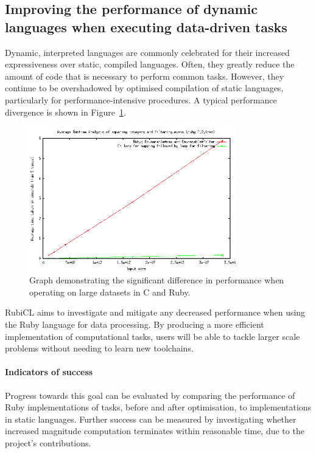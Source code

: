 \subsection{Improving the performance of dynamic languages when executing data-driven tasks}
Dynamic, interpreted languages are commonly celebrated for their increased expressiveness over static, compiled languages. Often, they greatly reduce the amount of code that is necessary to perform common tasks. However, they continue to be overshadowed by optimised compilation of static languages, particularly for performance-intensive procedures. A typical performance divergence is shown in Figure~\ref{fig:ruby_vs_c}.

\begin{figure}[h]
  \includegraphics[width=0.8\textwidth]{./figures/ruby_vs_c.png}
  \caption{Graph demonstrating the significant difference in performance when operating on large datasets in C and Ruby.}
  \label{fig:ruby_vs_c}
\end{figure}


RubiCL aims to investigate and mitigate any decreased performance when using the Ruby language for data processing. By producing a more efficient implementation of computational tasks, users will be able to tackle larger scale problems without needing to learn new toolchains.

\paragraph{Indicators of success}
Progress towards this goal can be evaluated by comparing the performance of Ruby implementations of tasks, before and after optimisation, to implementations in static languages. Further success can be measured by investigating whether increased magnitude computation terminates within reasonable time, due to the project's contributions.

